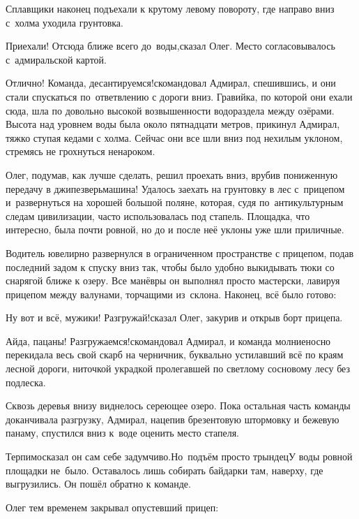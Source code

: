 \vspace{0.5cm}
\myldots{}Сплавщики наконец подъехали к крутому левому повороту, где направо вниз с~холма уходила грунтовка. 

\diagdash Приехали! Отсюда ближе всего до~воды,\mdash сказал Олег. Место согласовывалось с~адмиральской картой. 

\diagdash Отлично! Команда, десантируемся!\mdash скомандовал Адмирал, спешившись, и они стали спускаться по~ответвлению с дороги вниз. Гравийка, по которой они ехали сюда, шла по довольно высокой возвышенности водораздела между озёрами. Высота над уровнем воды была около пятнадцати метров, прикинул Адмирал, тяжко ступая кедами с холма. Сейчас они все шли вниз под нехилым уклоном, стремясь не грохнуться ненароком.

Олег, подумав, как лучше сделать, решил проехать вниз, врубив пониженную передачу в джипе\mdash зверь\nobreakdash\sdash\nobreakdash машина! Удалось заехать на грунтовку в лес с~прицепом и~развернуться на хорошей большой поляне, которая, судя по~антикультурным следам цивилизации, часто использовалась под стапель. Площадка, что интересно, была почти ровной, но до и после неё уклоны уже шли приличные.

Водитель ювелирно развернулся в ограниченном пространстве с прицепом, подав последний задом к спуску вниз так, чтобы было удобно выкидывать тюки со снарягой ближе к озеру. Все манёвры он выполнял просто мастерски, лавируя прицепом между валунами, торчащими из~склона. Наконец, всё было готово:

\diagdash Ну вот и всё, мужики! Разгружай!\mdash сказал Олег, закурив и открыв борт прицепа.

\diagdash Айда, пацаны! Разгружаемся!\mdash скомандовал Адмирал, и команда молниеносно перекидала весь свой скарб на черничник, буквально устилавший всё по краям лесной дороги, ниточкой украдкой пролегавшей по светлому сосновому лесу без подлеска. 

Сквозь деревья внизу виднелось сереющее озеро. Пока остальная часть команды доканчивала разгрузку, Адмирал, нацепив брезентовую штормовку и бежевую панаму, спустился вниз к~воде оценить место стапеля. 

\diagdash Терпимо\myldots{}\mdash сказал он сам себе задумчиво.\mdash Но~подъём просто трындец\myldots{}\mdash У воды ровной площадки не~было. Оставалось лишь собирать байдарки там, наверху, где выгрузились. Он пошёл обратно к команде.

Олег тем временем закрывал опустевший прицеп:

